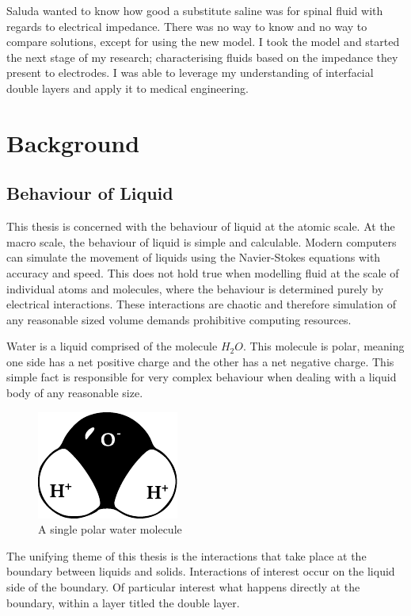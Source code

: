{Saluda wanted to know how good a substitute saline was for spinal fluid with regards to electrical impedance.
There was no way to know and no way to compare solutions, except for using the new model.
I took the model and started the next stage of my research; characterising fluids based on the impedance they present to electrodes.
I was able to leverage my understanding of interfacial double layers and apply it to medical engineering.

\section{Background}

\subsection{Behaviour of Liquid}
This thesis is concerned with the behaviour of liquid at the atomic scale.
At the macro scale, the behaviour of liquid is simple and calculable.
Modern computers can simulate the movement of liquids using the Navier-Stokes equations with accuracy and speed.
This does not hold true when modelling fluid at the scale of individual atoms and molecules, where the behaviour is determined purely by electrical interactions.
These interactions are chaotic and therefore simulation of any reasonable sized volume demands prohibitive computing resources.

Water is a liquid comprised of the molecule $H_{2}O$.
This molecule is polar, meaning one side has a net positive charge and the other has a net negative charge.
This simple fact is responsible for very complex behaviour when dealing with a liquid body of any reasonable size.

\begin{figure}
    \begin{center}
        \includegraphics{content/introduction/graphics/polarWater}
    \end{center}
    \caption{A single polar water molecule}
    \label{fig:waterMolecule}
\end{figure}

The unifying theme of this thesis is the interactions that take place at the boundary between liquids and solids.
Interactions of interest occur on the liquid side of the boundary.
Of particular interest what happens directly at the boundary, within a layer titled the double layer.

}
